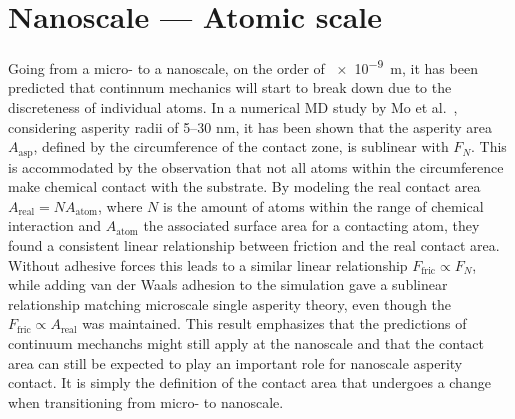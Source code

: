 \section{Nanoscale --- Atomic scale}\label{sec:nanoscale}
Going from a micro- to a nanoscale, on the order of \SI{e-9}{m}, it has been
predicted that continnum mechanics will start to break down
\cite{luan_breakdown_2005} due to the discreteness of individual atoms. In a
numerical \acrshort{MD} study by Mo et al.\ \cite{mo_friction_2009}, considering
asperity radii of 5--30 nm, it has been shown that the asperity area
$A_{\text{asp}}$, defined by the circumference of the contact zone, is
sublinear with $F_N$. This is accommodated by the observation that not all atoms
within the circumference make chemical contact with the substrate. By modeling
the real contact area $A_{\text{real}} = NA_{\text{atom}}$, where $N$ is the
amount of atoms within the range of chemical interaction and $A_{\text{atom}}$
the associated surface area for a contacting atom, they found a consistent linear relationship between friction and the real contact area. Without adhesive
forces this leads to a similar linear relationship $F_{\text{fric}} \propto F_N$,
while adding van der Waals adhesion to the simulation gave a sublinear
relationship matching microscale single asperity theory, even though the
$F_{\text{fric}} \propto A_{\text{real}}$ was maintained. This result emphasizes
that the predictions of continuum mechanchs might still apply at the nanoscale
and that the contact area can still be expected to play an important role for
nanoscale asperity contact. It is simply the definition of the contact area that
undergoes a change when transitioning from micro- to nanoscale. 



